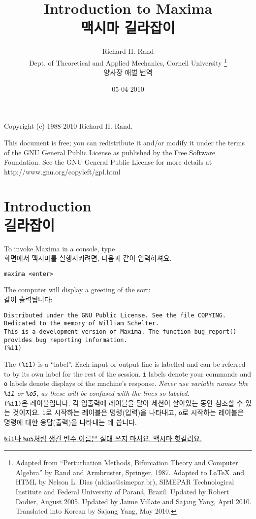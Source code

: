 \documentclass[a4paper,12pt]{article}
\title{Introduction to Maxima \\ 맥시마 길라잡이}
\author{Richard H. Rand\\ 
Dept. of Theoretical and Applied Mechanics, Cornell University
\thanks{Adapted from ``Perturbation Methods, Bifurcation Theory and Computer Algebra''
by Rand and Armbruster, Springer, 1987.
Adapted to \LaTeX\ and HTML by Nelson L. Dias (nldias@simepar.br), 
SIMEPAR Technological Institute and Federal University of Paraná, Brazil.
Updated by Robert Dodier, August 2005. 
Updated by Jaime Villate and Sajang Yang, April 2010. 
Translated into Korean by Sajang Yang, May 2010.} \\ 양사장 애벌 번역}
\date{05-04-2010}
\begin{document}
\maketitle

\noindent
Copyright (c) 1988-2010 Richard H. Rand.

\noindent
This document is free; you can redistribute it and/or modify it under
the terms of the GNU General Public License as published by the Free
Software Foundation. See the GNU General Public License for more
details at http://www.gnu.org/copyleft/gpl.html

\newpage
\tableofcontents

\newpage
\section{Introduction \\ 길라잡이 \label{sec:introduction}}

To invoke Maxima in a console, type \\
화면에서 맥시마를 실행시키려면, 다음과 같이 입력하셔요. 
\begin{verbatim}
maxima <enter>
\end{verbatim}


The computer will display a greeting of the sort: \\
 같이 출력됩니다: 
\begin{verbatim}
Distributed under the GNU Public License. See the file COPYING.
Dedicated to the memory of William Schelter.
This is a development version of Maxima. The function bug_report()
provides bug reporting information.
(%i1)
\end{verbatim}

The {\tt (\%i1)} is a ``label''.  Each input or output line is 
labelled and can be referred to by its own label for the rest of the 
session.  {\tt i} labels denote your commands and {\tt o} labels
denote displays of the machine's response.  \emph{Never use variable 
 names like {\tt \%i1} or {\tt \%o5}, as these will be confused with 
the lines so labeled}. \\

{\tt (\%i1)}은 레이블입니다. 각 입출력에 레이블을 달아 세션이 살아있는 동안 
참조할 수 있는 것이지요. {\tt i}로 시작하는 레이블은 명령(입력)을 나타내고, 
{\tt o}로 시작하는 레이블은 명령에 대한 응답(출력)을 나타내는 데 씁니다. 

 \underline{{\tt \%i1}나 {\tt \%o5}처럼 생긴 변수 이름은 절대 쓰지 마셔요. 
맥시마 헛갈려요.} \\
\end{document}
